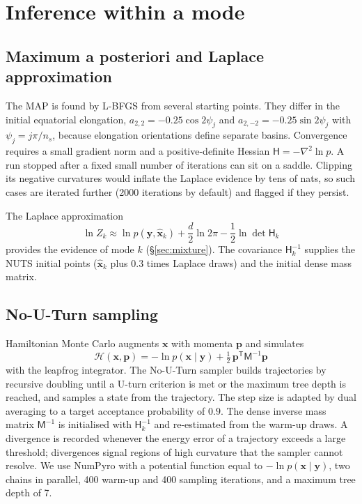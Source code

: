 \documentclass[11pt,a4paper]{article}
\theoremstyle{remark}
\newcommand{\vect}[1]{\bm{#1}}
\newcommand{\T}{^{\mathsf T}}
\begin{document}
\section{Inference within a mode}
\label{sec:nuts}

\subsection{Maximum a posteriori and Laplace approximation}
The MAP is found by L-BFGS \citep{liu1989,optax2020} from several starting points. They differ in the
initial equatorial elongation, $a_{2,2}=-0.25\cos2\psi_j$ and $a_{2,-2}=-0.25\sin2\psi_j$ with
$\psi_j=j\pi/n_s$, because elongation orientations define separate basins. Convergence requires a small
gradient norm and a positive-definite Hessian $\mathsf H=-\nabla^2\ln p$. A run stopped after a fixed
small number of iterations can sit on a saddle. Clipping its negative curvatures would inflate the
Laplace evidence by tens of nats, so such cases are iterated further (2000 iterations by default) and
flagged if they persist.

The Laplace approximation \citep{tierney1986}
\begin{equation}
  \ln Z_k\approx\ln p(\vect y,\hat{\vect x}_k)+\frac{d}{2}\ln2\pi-\frac12\ln\det\mathsf H_k
  \label{eq:laplaceZ}
\end{equation}
provides the evidence of mode $k$ (\S\ref{sec:mixture}). The covariance $\mathsf H_k^{-1}$ supplies the
NUTS initial points ($\hat{\vect x}_k$ plus $0.3$ times Laplace draws) and the initial dense mass matrix.

\subsection{No-U-Turn sampling}
Hamiltonian Monte Carlo \citep{neal2011,betancourt2017} augments $\vect x$ with momenta $\vect p$ and
simulates
\begin{equation}
  \mathcal H(\vect x,\vect p)=-\ln p(\vect x\mid\vect y)+\tfrac12\,\vect p\T\mathsf M^{-1}\vect p
\end{equation}
with the leapfrog integrator. The No-U-Turn sampler \citep{hoffman2014} builds trajectories by
recursive doubling until a U-turn criterion is met or the maximum tree depth is reached, and samples a
state from the trajectory. The step size is adapted by dual averaging \citep{nesterov2009} to a target
acceptance probability of $0.9$. The dense inverse mass matrix $\mathsf M^{-1}$ is initialised with
$\mathsf H_k^{-1}$ and re-estimated from the warm-up draws. A divergence is recorded whenever the
energy error of a trajectory exceeds a large threshold; divergences signal regions of high curvature
that the sampler cannot resolve. We use NumPyro \citep{phan2019,bingham2019} with a potential function
equal to $-\ln p(\vect x\mid\vect y)$, two chains in parallel, 400 warm-up and 400 sampling iterations,
and a maximum tree depth of 7.
\end{document}
